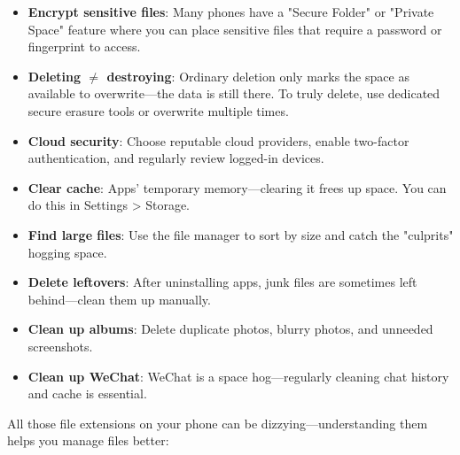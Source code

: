 
\begin{itemize}
  \item \textbf{Encrypt sensitive files}: Many phones have a "Secure Folder" or "Private Space" feature where you can place sensitive files that require a password or fingerprint to access.
  \item \textbf{Deleting $\neq$ destroying}: Ordinary deletion only marks the space as available to overwrite—the data is still there. To truly delete, use dedicated secure erasure tools or overwrite multiple times.
  \item \textbf{Cloud security}: Choose reputable cloud providers, enable two-factor authentication, and regularly review logged-in devices.
\end{itemize}


\begin{itemize}
  \item \textbf{Clear cache}: Apps' temporary memory—clearing it frees up space. You can do this in Settings > Storage.
  \item \textbf{Find large files}: Use the file manager to sort by size and catch the "culprits" hogging space.
  \item \textbf{Delete leftovers}: After uninstalling apps, junk files are sometimes left behind—clean them up manually.
  \item \textbf{Clean up albums}: Delete duplicate photos, blurry photos, and unneeded screenshots.
  \item \textbf{Clean up WeChat}: WeChat is a space hog—regularly cleaning chat history and cache is essential.
\end{itemize}


All those file extensions on your phone can be dizzying—understanding them helps you manage files better:

